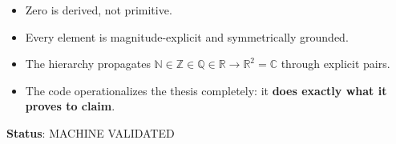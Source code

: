 \documentclass{article}
\begin{document}
\begin{itemize}
    \item Zero is derived, not primitive.
    \item Every element is magnitude-explicit and symmetrically grounded.
    \item The hierarchy propagates $\mathbb{N} \in \mathbb{Z} \in \mathbb{Q} \in \mathbb{R} \to \mathbb{R}^2 = \mathbb{C}$ through explicit pairs.
    \item The code operationalizes the thesis completely: it \textbf{does exactly what it proves to claim}.
\end{itemize}

\textbf{Status}: MACHINE VALIDATED
\end{document}
